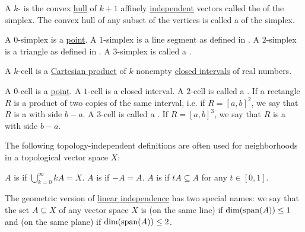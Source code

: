 \begin{definition}\label{def:simplex}
  A \( k \)- is the convex \hyperref[def:convex_set/hull]{hull} of \( k + 1 \) affinely \hyperref[affine_independence]{independent} vectors called the  of the simplex. The convex hull of any subset of the vertices is called a  of the simplex.

  \begin{thmenum}
     A \( 0 \)-simplex is a \hyperref[def:point]{point}.
     A \( 1 \)-simplex is a line segment as defined in .
     A \( 2 \)-simplex is a triangle as defined in .
     A \( 3 \)-simplex is called a .
  \end{thmenum}
\end{definition}

\begin{definition}\label{def:k_cell}
  A \( k \)-cell is a \hyperref[def:cartesian_product]{Cartesian product} of \( k \) nonempty \hyperref[def:total_order_interval/closed]{closed intervals} of real numbers.

  \begin{thmenum}
     A \( 0 \)-cell is a \hyperref[def:point]{point}.
     A \( 1 \)-cell is a closed interval.
     A \( 2 \)-cell is called a . If a rectangle \( R \) is a product of two copies of the same interval, i.e. if \( R = [a, b]^2 \), we say that \( R \) is a  with side \( b - a \).
     A \( 3 \)-cell is called a . If \( R = [a, b]^3 \), we say that \( R \) is a  with side \( b - a \).
  \end{thmenum}
\end{definition}

\begin{definition}\label{def:neighborhood_set_types}
  The following topology-independent definitions are often used for neighborhoods in a topological vector space \( X \):

  \begin{thmenum}
     \( A \) is  if \( \bigcup_{k=0}^\infty kA = X \).
     \( A \) is  if \( -A = A \).
     \( A \) is  if \( tA \subseteq A \) for any \( t \in [0, 1] \).
  \end{thmenum}
\end{definition}

\begin{definition}\label{def:collinear_complanar}
  The geometric version of \hyperref[def:left_module_linear_dependence]{linear independence} has two special names: we say that the set \( A \subseteq X \) of any vector space \( X \) is  (on the same line) if \( \dim(\operatorname{span}(A)) \leq 1 \) and  (on the same plane) if \( \dim(\operatorname{span}(A)) \leq 2 \).
\end{definition}
